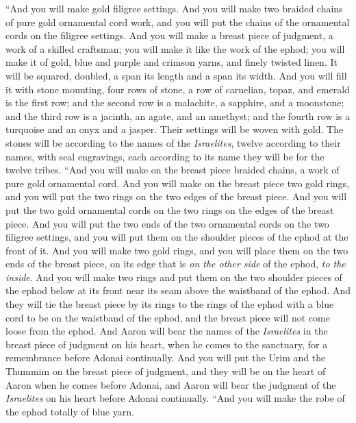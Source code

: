 \begin{biblechapter}
\verse “And you will make gold filigree settings.
\verse And you will make two braided chains of pure gold ornamental cord work, and you will put the chains of the ornamental cords on the filigree settings.
\verse And you will make a breast piece of judgment, a work of a skilled craftsman; you will make it like the work of the ephod; you will make it of gold, blue and purple and crimson yarns, and finely twisted linen.
\verse It will be squared, doubled, a span its length and a span its width.
\verse And you will fill it with stone mounting, four rows of stone, a row of carnelian, topaz, and emerald is the first row;
\verse and the second row is a malachite, a sapphire, and a moonstone;
\verse and the third row is a jacinth, an agate, and an amethyst;
\verse and the fourth row is a turquoise and an onyx and a jasper. Their settings will be woven with gold.
\verse The stones will be according to the names of the \textit{Israelites}, twelve according to their names, with seal engravings, each according to its name they will be for the twelve tribes.
\verse “And you will make on the breast piece braided chains, a work of pure gold ornamental cord.
\verse And you will make on the breast piece two gold rings, and you will put the two rings on the two edges of the breast piece.
\verse And you will put the two gold ornamental cords on the two rings on the edges of the breast piece.
\verse And you will put the two ends of the two ornamental cords on the two filigree settings, and you will put them on the shoulder pieces of the ephod at the front of it.
\verse And you will make two gold rings, and you will place them on the two ends of the breast piece, on its edge that is \textit{on the other side} of the ephod, \textit{to the inside}.
\verse And you will make two rings and put them on the two shoulder pieces of the ephod below at its front near its seam above the waistband of the ephod.
\verse And they will tie the breast piece by its rings to the rings of the ephod with a blue cord to be on the waistband of the ephod, and the breast piece will not come loose from the ephod.
\verse And Aaron will bear the names of the \textit{Israelites} in the breast piece of judgment on his heart, when he comes to the sanctuary, for a remembrance before Adonai continually.
\verse And you will put the Urim and the Thummim on the breast piece of judgment, and they will be on the heart of Aaron when he comes before Adonai, and Aaron will bear the judgment of the \textit{Israelites} on his heart before Adonai continually.
\verse “And you will make the robe of the ephod totally of blue yarn.

\end{biblechapter}
